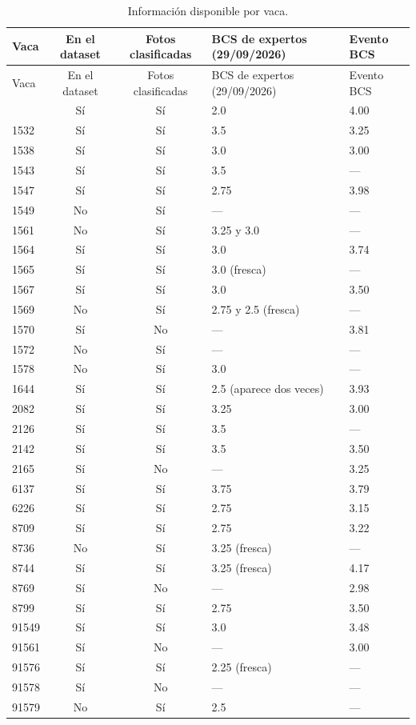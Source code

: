 \documentclass[11pt,letterpaper,DIV=12]{scrartcl}
\begin{document}
\begin{small}
\begin{longtable}{lccll}
\caption{Información disponible por vaca.}\label{tab:cruce}\\
\toprule
Vaca & En el dataset & Fotos clasificadas & BCS de expertos (29/09/2026) & Evento BCS \\
\midrule
\endfirsthead
\toprule
Vaca & En el dataset & Fotos clasificadas & BCS de expertos (29/09/2026) & Evento BCS \\
\midrule
\endhead
\bottomrule
\endfoot
1213 & Sí & Sí & 2.0 & 4.00 \\
1532 & Sí & Sí & 3.5 & 3.25 \\
1538 & Sí & Sí & 3.0 & 3.00 \\
1543 & Sí & Sí & 3.5 & — \\
1547 & Sí & Sí & 2.75 & 3.98 \\
1549 & No & Sí & — & — \\
1561 & No & Sí & 3.25 y 3.0 & — \\
1564 & Sí & Sí & 3.0 & 3.74 \\
1565 & Sí & Sí & 3.0 (fresca) & — \\
1567 & Sí & Sí & 3.0 & 3.50 \\
1569 & No & Sí & 2.75 y 2.5 (fresca) & — \\
1570 & Sí & No & — & 3.81 \\
1572 & No & Sí & — & — \\
1578 & No & Sí & 3.0 & — \\
1644 & Sí & Sí & 2.5 (aparece dos veces) & 3.93 \\
2082 & Sí & Sí & 3.25 & 3.00 \\
2126 & Sí & Sí & 3.5 & — \\
2142 & Sí & Sí & 3.5 & 3.50 \\
2165 & Sí & No & — & 3.25 \\
6137 & Sí & Sí & 3.75 & 3.79 \\
6226 & Sí & Sí & 2.75 & 3.15 \\
8709 & Sí & Sí & 2.75 & 3.22 \\
8736 & No & Sí & 3.25 (fresca) & — \\
8744 & Sí & Sí & 3.25 (fresca) & 4.17 \\
8769 & Sí & No & — & 2.98 \\
8799 & Sí & Sí & 2.75 & 3.50 \\
91549 & Sí & Sí & 3.0 & 3.48 \\
91561 & Sí & No & — & 3.00 \\
91576 & Sí & Sí & 2.25 (fresca) & — \\
91578 & Sí & No & — & — \\
91579 & No & Sí & 2.5 & — \\
\end{longtable}
\end{small}
\end{document}
